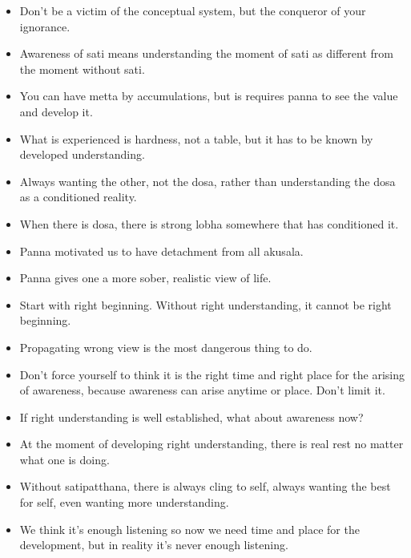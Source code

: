 \documentclass{article}
\begin{document}
\begin{itemize}
\item 
  Don't be a victim of the conceptual system, but the conqueror of
  your ignorance.

\item 
  Awareness of sati means understanding the moment of sati as
  different from the moment without sati.

\item 
  You can have metta by accumulations, but is requires panna to see
  the value and develop it.

\item 
  What is experienced is hardness, not a table, but it has to be
  known by developed understanding.

\item 
  Always wanting the other, not the dosa, rather than understanding
  the dosa as a conditioned reality.

\item 
  When there is dosa, there is strong lobha somewhere that has
  conditioned it.

\item 
  Panna motivated us to have detachment from all akusala.

\item 
  Panna gives one a more sober, realistic view of life.

\item 
  Start with right beginning. Without right understanding, it cannot
  be right beginning.

\item 
  Propagating wrong view is the most dangerous thing to do.

\item 
  Don't force yourself to think it is the right time and right place
  for the arising of awareness, because awareness can arise anytime
  or place. Don't limit it.

\item 
  If right understanding is well established, what about awareness
  now?

\item 
  At the moment of developing right understanding, there is real rest
  no matter what one is doing.

\item 
  Without satipatthana, there is always cling to self, always wanting
  the best for self, even wanting more understanding.

\item 
  We think it's enough listening so now we need time and place for
  the development, but in reality it's never enough listening.


\end{itemize}
\end{document}
